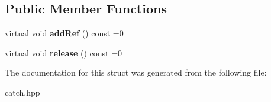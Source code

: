 \subsection*{Public Member Functions}
\begin{DoxyCompactItemize}
\item 
\mbox{\label{structCatch_1_1IShared_ae383df68557cdaf0910b411af04d9e33}} 
virtual void {\bfseries add\+Ref} () const =0
\item 
\mbox{\label{structCatch_1_1IShared_a002f52624728a763956fb6f230cb2f57}} 
virtual void {\bfseries release} () const =0
\end{DoxyCompactItemize}


The documentation for this struct was generated from the following file\+:\begin{DoxyCompactItemize}
\item 
catch.\+hpp\end{DoxyCompactItemize}
